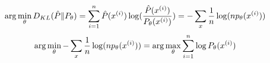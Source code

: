 \begin{answer}
$$ \arg\min_\theta D_{KL}(\hat{P}\|P_\theta)  =\sum_{i=1}^{{n}} \hat{P}(x^{(i)}) \log(\frac{ \hat{P}(x^{(i)})}{P_\theta(x^{(i)})}) = -\sum_x \frac{1}{n} \log(n p_\theta(x^{(i)})) $$
$$\arg\min_\theta  -\sum_x \frac{1}{n} \log(n p_\theta(x^{(i)})) = \arg\max_\theta \sum_{i=1}^{{n}} \log P_\theta(x^{(i)})$$
\end{answer}
